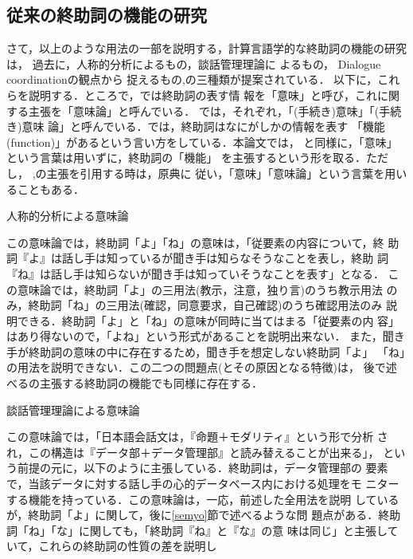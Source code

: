 \subsection{従来の終助詞の機能の研究}
さて，以上のような用法の一部を説明する，計算言語学的な終助詞の機能の研究は，
過去に，人称的分析によるもの\cite{kawamori91,kamio90}，談話管理理論に
よるもの\cite{kinsui93,kinsui93-3}， Dialogue coordinationの観点から
捉えるもの\cite{katagiri93},の三種類が提案されている．
以下に，これらを説明する．ところで，\cite{kawamori91}では終助詞の表す情
報を「意味」と呼び，これに関する主張を「意味論」と呼んでいる．
\cite{kinsui93,kinsui93-3}では，それぞれ，「(手続き)意味」「(手続き)意味
論」と呼んでいる．\cite{katagiri93}では，終助詞はなにがしかの情報を表す
「機能(function)」があるという言い方をしている．本論文では，
\cite{katagiri93}と同様に，「意味」という言葉は用いずに，終助詞の「機能」
を主張するという形を取る．ただし，
\cite{kawamori91},\cite{kinsui93,kinsui93-3}の主張を引用する時は，原典に
従い，「意味」「意味論」という言葉を用いることもある．
\begin{flushleft}
{\dg 人称的分析による意味論}\cite{kawamori91,kamio90}
\end{flushleft}
この意味論では，終助詞「よ」「ね」の意味は，「従要素の内容について，終
助詞『よ』は話し手は知っているが聞き手は知らなそうなことを表し，終助
詞『ね』は話し手は知らないが聞き手は知っていそうなことを表す」となる．
この意味論では，終助詞「よ」の三用法(教示，注意，独り言)のうち教示用法
のみ，終助詞「ね」の三用法(確認，同意要求，自己確認)のうち確認用法のみ
説明できる．終助詞「よ」と「ね」の意味が同時に当てはまる「従要素の内
容」はあり得ないので，「よね」という形式があることを説明出来ない．
また，聞き手が終助詞の意味の中に存在するため，聞き手を想定しない終助詞「よ」
「ね」の用法を説明できない．この二つの問題点(とその原因となる特徴)は，
後で述べる\cite{katagiri93}の主張する終助詞の機能でも同様に存在する．
\begin{flushleft}
{\dg 談話管理理論による意味論}\cite{kinsui93,kinsui93-3}
\end{flushleft}
この意味論では，「日本語会話文は，『命題＋モダリティ』という形で分析
され，この構造は『データ部＋データ管理部』と読み替えることが出来る」，
という前提の元に，以下のように主張している．終助詞は，データ管理部の
要素で，当該データに対する話し手の心的データベース内における処理をモ
ニターする機能を持っている．この意味論は，一応，前述した全用法を説明
しているが，終助詞「よ」に関して，後に\ref{semyo}節で述べるような問
題点がある．終助詞「ね」「な」に関しても，「終助詞『ね』と『な』の意
味は同じ」と主張していて，これらの終助詞の性質の差を説明し
